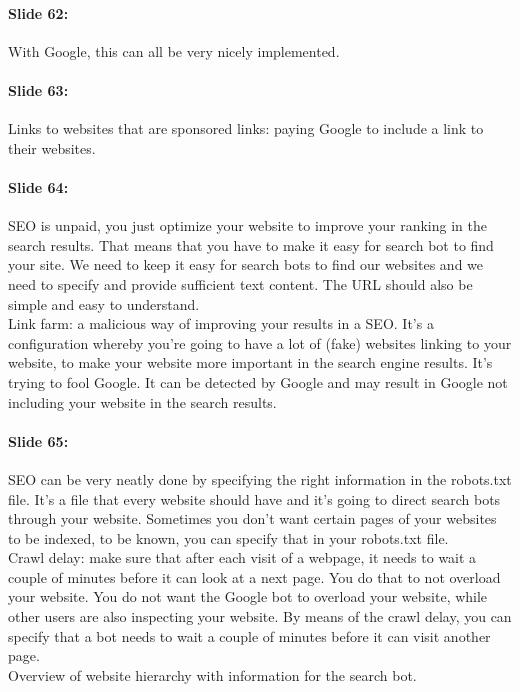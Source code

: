 \documentclass[10pt,a4paper]{report}
\begin{document}
\paragraph{Slide 62:}With Google, this can all be very nicely implemented.

\paragraph{Slide 63:}Links to websites that are sponsored links: paying Google to include a link to their websites.

\paragraph{Slide 64:}SEO is unpaid, you just optimize your website to improve your ranking in the search results. That means that you have to make it easy for search bot to find your site. We need to keep it easy for search bots to find our websites and we need to specify and provide sufficient text content. The URL should also be simple and easy to understand.\\
Link farm: a malicious way of improving your results in a SEO. It's a configuration whereby you're going to have a lot of (fake) websites linking to your website, to make your website more important in the search engine results. It's trying to fool Google. It can be detected by Google and may result in Google not including your website in the search results.

\paragraph{Slide 65:}SEO can be very neatly done by specifying the right information in the robots.txt file. It's a file that every website should have and it's going to direct search bots through your website.
Sometimes you don't want certain pages of your websites to be indexed, to be known, you can specify that in your robots.txt file.\\
Crawl delay: make sure that after each visit of a webpage, it needs to wait a couple of minutes before it can look at a next page. You do that to not overload your website. You do not want the Google bot to overload your website, while other users are also inspecting your website. By means of the crawl delay, you can specify that a bot needs to wait a couple of minutes before it can visit another page.\\
Overview of website hierarchy with information for the search bot.
\end{document}
